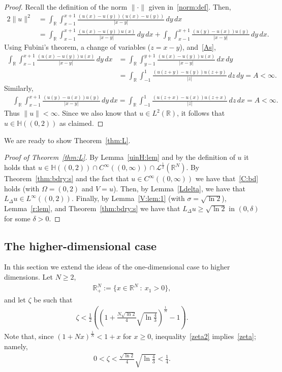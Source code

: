 \documentclass[11pt]{article}
\newcommand{\R}{\mathbb{R}}
\numberwithin{equation}{section}
\newcommand{\cL}{{\mathcal L}}
\begin{document}
\begin{proof}
Recall the definition of the norm $\|\cdot\|$ given in~\eqref{norm:def}.  Then,
\begin{align*}
2\|u\|^2
&=\int_{\R}\int_{x-1}^{x+1}\frac{(u(x)-u(y))(u(x)-u(y))}{|x-y|}\, dy\, dx\\
&=\int_{\R}\int_{x-1}^{x+1}
    \frac{(u(x)-u(y))u(x)}{|x-y|}\, dy\, dx
    + \int_{\R}\int_{x-1}^{x+1}\frac{(u(y)-u(x))u(y)}{|x-y|}
    \, dy\, dx.
\end{align*}
Using Fubini's theorem, a change of variables ($z=x-y$), and~\eqref{As},
\begin{align*}
\int_{\R} \int_{x-1}^{x+1}
    \frac{(u(x)-u(y))u(x)}{|x-y|}\, dy\, dx
&=
\int_{\R} \int_{y-1}^{y+1}
    \frac{(u(x)-u(y))u(x)}{|x-y|}\, dx\, dy\\
    &=
\int_{\R} \int_{-1}^{1}
    \frac{(u(z+y)-u(y))u(z+y)}{|z|}\, dz\, dy=A<\infty.
\end{align*}
Similarly,
\begin{align*}
&\int_{\R}\int_{x-1}^{x+1}\frac{(u(y)-u(x))u(y)}{|x-y|}\, dy\, dx
=\int_{\R}\int_{-1}^{1}\frac{(u(z+x)-u(x))u(z+x)}{|z|}\, dz\, dx=A<\infty.
\end{align*}
Thus $\|u\|<\infty$.  Since we also know that $u\in L^2(\R)$, it follows that $u\in {\mathbb H}((0,2))$ as claimed.
\end{proof}

We are ready to show Theorem~\ref{thm:L}. 

\begin{proof}[Proof of Theorem~\ref{thm:L}]
By Lemma~\ref{uinH:lem} and by the definition of $u$ it holds that $u\in{\mathbb H}((0,2))\cap C^\infty((0,\infty))\cap \cL^{\frac{1}{2}}(\R^N)$. By Theorem~\ref{thm:bdry:s} and the fact that $u\in C^\infty((0,\infty))$ we have that~\eqref{C:bd} holds (with $\Omega=(0,2)$ and $V=u$). Then, by Lemma~\ref{Ldelta}, we have that $L_\Delta u\in L^\infty((0,2))$.  Finally, by Lemma~\ref{V:lem:1} (with $\sigma=\sqrt{\ln 2}$), Lemma~\ref{r:lem}, and Theorem~\ref{thm:bdry:s} we have that $L_\Delta u\geq \sqrt{\ln 2}$ in $(0,\delta)$ for some $\delta>0$.
\end{proof}


\subsection{The higher-dimensional case}

In this section we extend the ideas of the one-dimensional case to higher dimensions.  Let $N\geq 2$,
\begin{align*}
\R^N_+:=\{x\in\R^N\::\: x_1>0\},    
\end{align*}
and let $\zeta$ be such that
\begin{align}\label{zeta2}
\zeta<\frac{1}{2}\left(\left(1+\frac{N\sqrt{\ln 2}}{4}\sqrt{\ln \frac{4}{3}}\right)^\frac{1}{N}-1\right).
\end{align}
Note that, since $(1+Nx)^{\frac{1}{N}}<1+x$ for $x\geq 0$, inequality~\eqref{zeta2} implies~\eqref{zeta}; namely, 
\begin{align*}
0<\zeta<\frac{\sqrt{\ln 2}}{4}\sqrt{\ln \frac{4}{3}}<\frac{1}{4}.
\end{align*}
\end{document}
